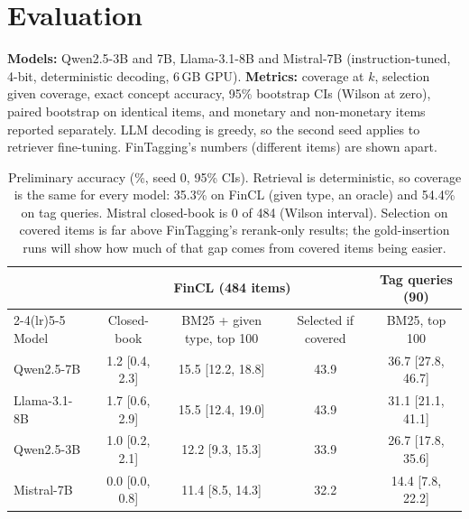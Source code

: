\documentclass[10pt]{article}
\begin{document}
\section{Evaluation}
\textbf{Models:} Qwen2.5-3B and 7B, Llama-3.1-8B and Mistral-7B (instruction-tuned, 4-bit, deterministic decoding,
6\,GB GPU). \textbf{Metrics:} coverage at $k$, selection given coverage, exact concept accuracy, 95\% bootstrap CIs
(Wilson at zero), paired bootstrap on identical items, and monetary and non-monetary items reported separately. LLM
decoding is greedy, so the second seed applies to retriever fine-tuning. FinTagging's numbers (different items) are shown apart.
\begin{table}[h]
\centering\small
\begin{tabular}{lcccc}
\toprule
 & \multicolumn{3}{c}{FinCL (484 items)} & Tag queries (90) \\
\cmidrule(lr){2-4}\cmidrule(lr){5-5}
Model & Closed-book & BM25 + given type, top 100 & Selected if covered & BM25, top 100 \\
\midrule
Qwen2.5-7B   & 1.2 [0.4, 2.3] & 15.5 [12.2, 18.8] & 43.9 & 36.7 [27.8, 46.7] \\
Llama-3.1-8B & 1.7 [0.6, 2.9] & 15.5 [12.4, 19.0] & 43.9 & 31.1 [21.1, 41.1] \\
Qwen2.5-3B   & 1.0 [0.2, 2.1] & 12.2 [9.3, 15.3]  & 33.9 & 26.7 [17.8, 35.6] \\
Mistral-7B   & 0.0 [0.0, 0.8] & 11.4 [8.5, 14.3]  & 32.2 & 14.4 [7.8, 22.2] \\
\bottomrule
\end{tabular}
\caption{\footnotesize Preliminary accuracy (\%, seed 0, 95\% CIs). Retrieval is deterministic, so coverage is the same
for every model: 35.3\% on FinCL (given type, an oracle) and 54.4\% on tag queries. Mistral closed-book is 0 of 484
(Wilson interval). Selection on covered items is far above FinTagging's rerank-only results; the gold-insertion runs
will show how much of that gap comes from covered items being easier.}
\end{table}
\end{document}

